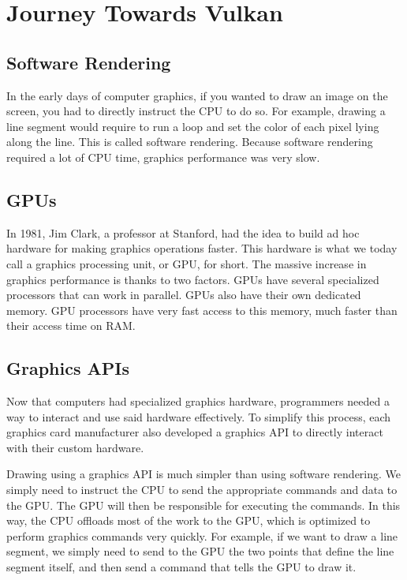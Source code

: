 \chapter{Journey Towards Vulkan}
\label{chap:Vulkan}

\section{Software Rendering}

In the early days of computer graphics, if you wanted to draw an image on the
screen, you had to directly instruct the CPU to do so.
For example, drawing a line segment would require to run a loop and set the
color of each pixel lying along the line.
This is called software rendering.
Because software rendering required a lot of CPU time, graphics performance
was very slow.

\section{GPUs}

In 1981, Jim Clark, a professor at Stanford, had the idea to build
ad hoc hardware for making graphics operations faster.
This hardware is what we today call a graphics processing unit, or
GPU, for short.
The massive increase in graphics performance is thanks to two factors.
GPUs have several specialized processors that can work in parallel.
GPUs also have their own dedicated memory.
GPU processors have very fast access to this memory, much faster than
their access time on RAM.

\section{Graphics APIs}

Now that computers had specialized graphics hardware, programmers
needed a way to interact and use said hardware effectively.
To simplify this process, each graphics card manufacturer also developed
a graphics API to directly interact with their custom hardware.

Drawing using a graphics API is much simpler than using software rendering.
We simply need to instruct the CPU to send the appropriate commands and data
to the GPU.
The GPU will then be responsible for executing the commands.
In this way, the CPU offloads most of the work to the GPU, which is optimized
to perform graphics commands very quickly.
For example, if we want to draw a line segment, we simply need to send to the
GPU the two points that define the line segment itself, and then send a
command that tells the GPU to draw it.

